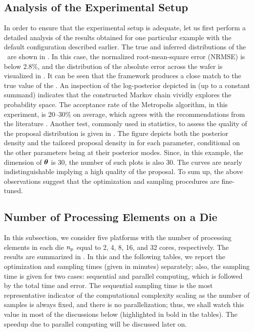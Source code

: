 \subsection{Analysis of the Experimental Setup}

In order to ensure that the experimental setup is adequate, let us first perform a detailed analysis of the results obtained for one particular example with the default configuration described earlier.
The true and inferred distributions of the \qoi\ are shown in . In this case, the normalized root-mean-square error (NRMSE) is below $2.8\%$, and the distribution of the absolute error across the wafer is visualized in . It can be seen that the framework produces a close match to the true value of the \qoi.
An inspection of the log-posterior depicted in  (up to a constant summand) indicates that the constructed Markov chain vividly explores the probability space.
The acceptance rate of the Metropolis algorithm, in this experiment, is $20$--$30\%$ on average, which agrees with the recommendations from the literature \cite{gelman2004}.
Another test, commonly used in statistics, to assess the quality of the proposal distribution is given in . The figure depicts both the posterior density and the tailored proposal density in  for each parameter, conditional on the other parameters being at their posterior modes.
Since, in this example, the dimension of ${\boldsymbol\theta}$ is 30, the number of such plots is also 30. The curves are nearly indistinguishable implying a high quality of the proposal. To sum up, the above observations suggest that the optimization and sampling procedures are fine-tuned.

\subsection{Number of Processing Elements on a Die}
In this subsection, we consider five platforms with the number of processing elements in each die ${n_\text{p}}$ equal to 2, 4, 8, 16, and 32 cores, respectively. The results are summarized in .
In this and the following tables, we report the optimization and sampling times (given in minutes) separately; also, the sampling time is given for two cases: sequential and parallel computing, which is followed by the total time and error.
The sequential sampling time is the most representative indicator of the computational complexity scaling as the number of samples is always fixed, and there is no parallelization; thus, we shall watch this value in most of the discussions below (highlighted in bold in the tables). The speedup due to parallel computing will be discussed later on.


